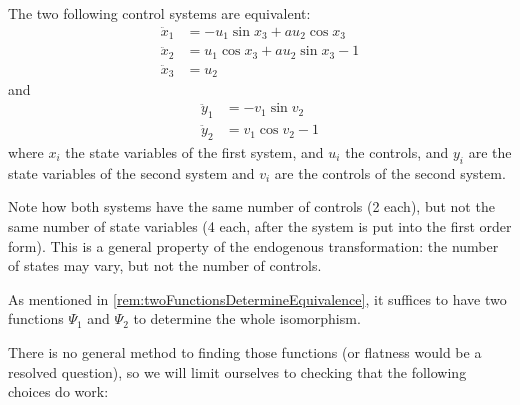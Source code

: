 \documentclass[12pt]{article}
\begin{document}
\begin{example}
  \label{exp:twoEquivalentSystems}
  The two following control systems are equivalent:
  \begin{equation}\label{eq:equivalentSystemsX}\begin{aligned}
      \ddot{x}_1 &= -u_1 \sin{x_3} + a u_2 \cos{x_3} \\
      \ddot{x}_2 &= u_1 \cos{x_3} + a u_2 \sin{x_3} - 1 \\
      \ddot{x}_3 &= u_2
    \end{aligned}\end{equation}
  and
  \begin{equation}\label{eq:equivalentSystemsY}\begin{aligned} 
      \ddot{y}_1 &= -v_1 \sin{v_2} \\
      \ddot{y}_2 &= v_1 \cos{v_2} - 1
  \end{aligned}\end{equation}
  where $x_i$ the state variables of the first system, and $u_i$ the controls,
  and $y_i$ are the state variables of the second system and $v_i$ are the
  controls of the second system.
  
  Note how both systems have the same number of controls (2 each), but not the
  same number of state variables (4 each, after the system is put into the first
  order form). This is a general property of the endogenous transformation: the
  number of states may vary, but not the number of controls.

  As mentioned in \ref{rem:twoFunctionsDetermineEquivalence}, it suffices to
  have two functions $\Psi_1$ and $\Psi_2$ to determine the whole isomorphism.

  There is no general method to finding those functions (or flatness would be a
  resolved question), so we will limit ourselves to checking that the following choices do work:
  

\end{example}
\end{document}
